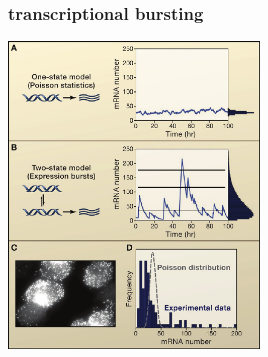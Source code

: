 \begin{frame}
\vspace{1em}
\frametitle{transcriptional bursting}
\begin{center}
\includegraphics[width=0.5\textwidth]{fig/rajvOf3thresh.pdf}\\
\hfill \cite{Raj2008a}
\end{center}
\end{frame}

